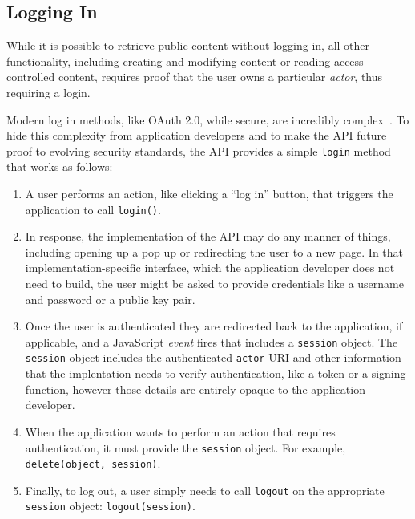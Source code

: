 
\subsection{Logging In}

While it is possible to retrieve public content without logging in,
all other functionality, including
creating and modifying content or reading access-controlled content,
requires proof that the user owns a particular \emph{actor}, thus requiring a login.

Modern log in methods, like OAuth 2.0, while secure, are incredibly complex~\cite{oauth}.
To hide this complexity from application developers and to make the API future proof
to evolving security standards, the API provides a simple \texttt{login} method that works as follows:

\begin{enumerate}
\item
A user performs an action, like clicking a ``log in'' button, that triggers
the application to call \texttt{login()}.
\item
In response, the implementation of the API may do any manner of things,
including opening up a pop up or redirecting the user to a new page.
In that implementation-specific interface, which the application developer
does not need to build, the user might be asked to provide credentials like a username
and password or a public key pair.
\item
Once the user is authenticated they are redirected back to the application, if applicable,
and a JavaScript \emph{event} fires that includes
a \texttt{session} object. The \texttt{session} object includes the authenticated \texttt{actor}
URI and other information that the implentation needs to verify authentication, like
a token or a signing function, however those details are entirely opaque to the application developer.
\item
When the application wants to perform an action that requires authentication,
it must provide the \texttt{session} object. For example,
\texttt{delete(object, session)}.
\item
Finally, to log out, a user simply needs to call \texttt{logout} on the appropriate
\texttt{session} object: \texttt{logout(session)}.
\end{enumerate}

